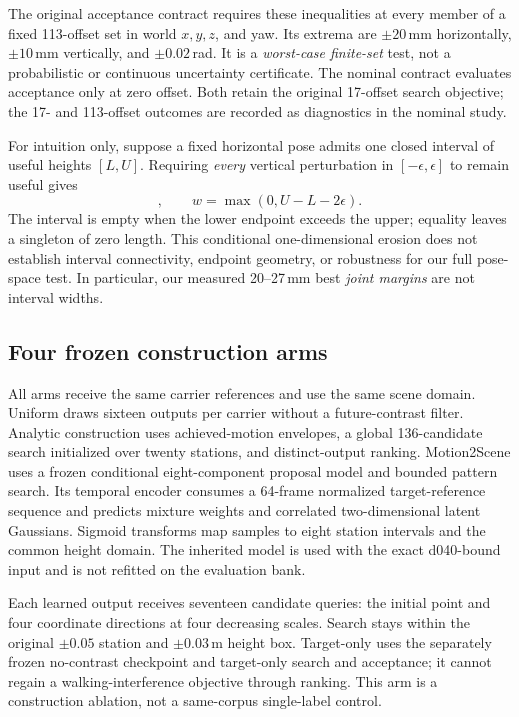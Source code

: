 \documentclass[letterpaper,10pt,conference]{ieeeconf}
\begin{document}
The original acceptance contract requires these inequalities at every member
of a fixed 113-offset set in world $x,y,z$, and yaw. Its extrema are
$\pm20$\,mm horizontally, $\pm10$\,mm vertically, and $\pm0.02$\,rad.
It is a \emph{worst-case finite-set} test, not a probabilistic or continuous
uncertainty certificate. The nominal contract evaluates acceptance only at
zero offset. Both retain the original 17-offset search objective; the 17- and
113-offset outcomes are recorded as diagnostics in the nominal study.

For intuition only, suppose a fixed horizontal pose admits one closed interval
of useful heights $[L,U]$. Requiring \emph{every} vertical perturbation in
$[-\epsilon,\epsilon]$ to remain useful gives
\begin{equation}
[L+\epsilon,U-\epsilon],\qquad
w=\max(0,U-L-2\epsilon).
\end{equation}
The interval is empty when the lower endpoint exceeds the upper; equality
leaves a singleton of zero length. This conditional one-dimensional erosion
does not establish interval connectivity, endpoint geometry, or robustness
for our full pose-space test. In particular, our measured 20--27\,mm best
\emph{joint margins} are not interval widths.

\subsection{Four frozen construction arms}
All arms receive the same carrier references and use the same scene domain.
Uniform draws sixteen outputs per carrier without a future-contrast filter.
Analytic construction uses achieved-motion envelopes, a global 136-candidate
search initialized over twenty stations, and distinct-output ranking.
Motion2Scene uses a frozen conditional eight-component proposal model and
bounded pattern search. Its temporal encoder consumes a 64-frame normalized
target-reference sequence and predicts mixture weights and correlated
two-dimensional latent Gaussians. Sigmoid transforms map samples to eight
station intervals and the common height domain. The inherited model is used
with the exact d040-bound input and is not refitted on the evaluation bank.

Each learned output receives seventeen candidate queries: the initial point
and four coordinate directions at four decreasing scales. Search stays within
the original $\pm0.05$ station and $\pm0.03$\,m height box. Target-only uses
the separately frozen no-contrast checkpoint and target-only search and
acceptance; it cannot regain a walking-interference objective through ranking.
This arm is a construction ablation, not a same-corpus single-label control.
\end{document}
